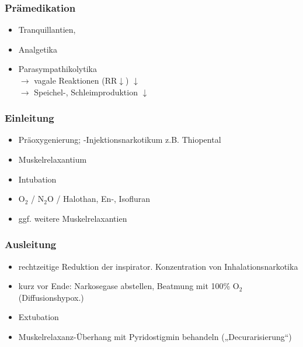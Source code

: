 \documentclass[10pt,a4paper]{report}
\begin{document}
\subsubsection{Prämedikation} %
\label{ssub:pr_medikation}
\begin{itemize}
	\item Tranquillantien, 
	\item Analgetika
	\item Parasympathikolytika\\
	$\rightarrow$ vagale Reaktionen (RR$\downarrow$) $\downarrow$\\
	$\rightarrow$ Speichel-, Schleimproduktion $\downarrow$
\end{itemize}
\subsubsection{Einleitung} %
\label{ssub:einleitung}
\begin{itemize}
	\item Präoxygenierung; -Injektionsnarkotikum z.B. Thiopental
	\item Muskelrelaxantium
	\item Intubation
	\item O$_2$ / N$_2$O / Halothan, En-, Isofluran
	\item ggf. weitere Muskelrelaxantien
\end{itemize}
\subsubsection{Ausleitung} %
\label{ssub:ausleitung}
\begin{itemize}
	\item rechtzeitige Reduktion der inspirator. Konzentration von Inhalationsnarkotika
	\item kurz vor Ende: Narkosegase abstellen, Beatmung mit 100\% O$_2$   (Diffusionshypox.)
	\item Extubation
	\item Muskelrelaxanz-Überhang mit Pyridostigmin behandeln („Decurarisierung“)
\end{itemize}
\end{document}
